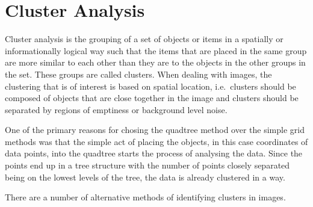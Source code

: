
\section{Cluster Analysis}
\label{sec:cluster_analysis}

Cluster analysis is the grouping of a set of objects or items in a spatially or
informationally logical way such that the items that are placed in the same
group are more similar to each other than they are to the objects in the other
groups in the set. These groups are called clusters. When dealing with images,
the clustering that is of interest is based on spatial location, i.e.\ clusters
should be composed of objects that are close together in the image and clusters
should be separated by regions of emptiness or background level noise.

One of the primary reasons for chosing the quadtree method over the simple grid
methods was that the simple act of placing the objects, in this case
coordinates of data points, into the quadtree starts the process of analysing
the data. Since the points end up in a tree structure with the number of points
closely separated being on the lowest levels of the tree, the data is already
clustered in a way.

There are a number of alternative methods of identifying clusters in images.


